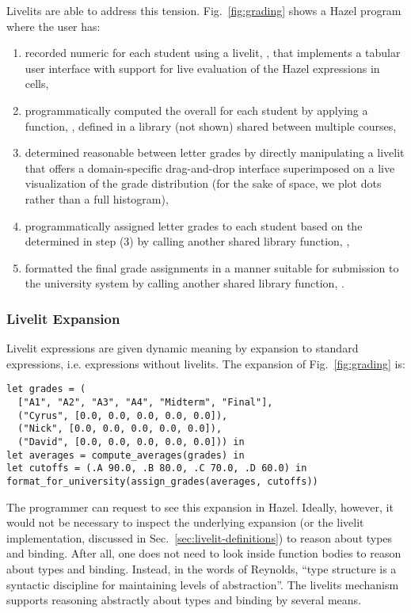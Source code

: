 Livelits are able to address this tension. 
Fig.~\ref{fig:grading} shows a Hazel program where the user has:
\begin{enumerate}
\item recorded numeric  for each student using a livelit, , that implements a tabular user interface with support for live evaluation of the Hazel expressions in cells, 
\item programmatically computed the overall  for each student by applying a function, , defined in a library  (not shown) shared between multiple courses, 
\item determined reasonable  between letter grades by directly manipulating a livelit that offers a domain-specific drag-and-drop interface superimposed on a live visualization of the grade distribution 
(for the sake of space, we plot dots rather than a full histogram), 
\item programmatically assigned letter grades to each student based on the  determined in step (3) by calling another shared library function, , 
\item formatted the final grade assignments in a manner suitable for submission to the university system by calling another shared library function, .
\end{enumerate}

\subsubsection{Livelit Expansion} 
Livelit expressions are given dynamic meaning by expansion to standard expressions, i.e. expressions without livelits.
The expansion of Fig.~\ref{fig:grading} is:

\begin{lstlisting}
let grades = (
  ["A1", "A2", "A3", "A4", "Midterm", "Final"],
  ("Cyrus", [0.0, 0.0, 0.0, 0.0, 0.0]),
  ("Nick", [0.0, 0.0, 0.0, 0.0, 0.0]),
  ("David", [0.0, 0.0, 0.0, 0.0, 0.0])) in 
let averages = compute_averages(grades) in 
let cutoffs = (.A 90.0, .B 80.0, .C 70.0, .D 60.0) in 
format_for_university(assign_grades(averages, cutoffs))
\end{lstlisting}

The programmer can request to see this expansion in Hazel. 
Ideally, however, it would not be necessary to inspect the underlying expansion 
(or the livelit implementation, discussed in Sec.~\ref{sec:livelit-definitions}) 
to reason about types and binding. 
After all, one does not need to look inside 
function bodies to reason about types and binding.
Instead, in the words of Reynolds, 
``type structure is a syntactic discipline for maintaining levels of abstraction''.
The livelits mechanism supports reasoning abstractly about types and binding by 
several means.

